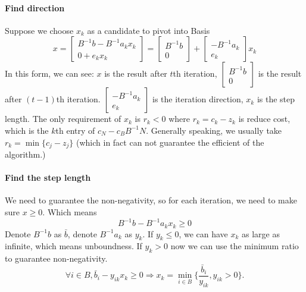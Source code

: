                 \paragraph{Find direction}
                    Suppose we choose $x_k$ as a candidate to pivot into Basis\\
                    \begin{equation}
                        x = \left[ \begin{matrix}B^{-1}b-B^{-1}a_kx_k \\ 0+e_kx_k\end{matrix}\right]=\left[ \begin{matrix}B^{-1}b \\ 0\end{matrix} \right] + \left[ \begin{matrix} -B^{-1}a_k \\ e_k \end{matrix} \right]x_k \nonumber
                    \end{equation}
                    In this form, we can see: $x$ is the result after $t$th iteration, $\left[ \begin{matrix}B^{-1}b \\ 0\end{matrix} \right]$ is the result after $(t-1)$th iteration. $ \left[ \begin{matrix} -B^{-1}a_k \\ e_k \end{matrix} \right]$ is the iteration direction, $x_k$ is the step length. The only requirement of $x_k$ is $r_k < 0$ where $r_k=c_k - z_k$ is reduce cost, which is the $k$th entry of $c_N - c_BB^{-1}N$. Generally speaking, we usually take $r_k = \min\{c_j - z_j\}$ (which in fact can not guarantee the efficient of the algorithm.)

                \paragraph{Find the step length}
                    We need to guarantee the non-negativity, so for each iteration, we need to make sure $x\ge 0$. Which means
                    \begin{equation}
                        B^{-1}b-B^{-1}a_kx_k \ge 0 \nonumber 
                    \end{equation}
                    Denote $B^{-1}b$ as $\bar{b}$, denote $B^{-1}a_k$ as $y_k$. If $y_k \le 0$, we can have $x_k$ as large as infinite, which means unboundness. If $y_k > 0$ now we can use the minimum ratio to guarantee non-negativity.
                    \begin{equation}
                        \forall i \in B, \bar{b}_i - y_{ik} x_k \ge 0 \Rightarrow x_k = \min_{i \in B} \{\frac{\bar{b}_i}{y_{ik}}, y_{ik} > 0\}.\nonumber
                    \end{equation}

